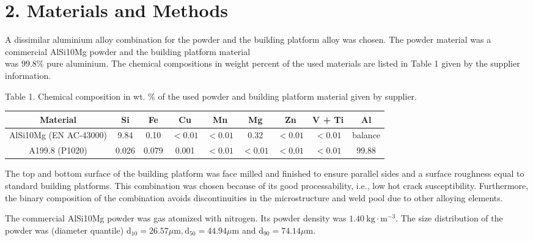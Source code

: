 \documentclass[10pt]{article}
\begin{document}
\section*{2. Materials and Methods}
A dissimilar aluminium alloy combination for the powder and the building platform alloy was chosen. The powder material was a commercial AlSi10Mg powder and the building platform material\\
was $99.8 \%$ pure aluminium. The chemical compositions in weight percent of the used materials are listed in Table 1 given by the supplier information.

Table 1. Chemical composition in wt. \% of the used powder and building platform material given by supplier.

\begin{center}
\begin{tabular}{ccccccccc}
\hline
Material & Si & Fe & Cu & Mn & Mg & Zn & V + Ti & Al \\
\hline
AlSi10Mg (EN AC-43000) & 9.84 & 0.10 & $<0.01$ & $<0.01$ & 0.32 & $<0.01$ & $<0.01$ & balance \\
A199.8 (P1020) & 0.026 & 0.079 & 0.001 & $<0.01$ & $<0.01$ & $<0.01$ & $<0.01$ & 99.88 \\
\hline
\end{tabular}
\end{center}

The top and bottom surface of the building platform was face milled and finished to ensure parallel sides and a surface roughness equal to standard building platforms. This combination was chosen because of its good processability, i.e., low hot crack susceptibility. Furthermore, the binary composition of the combination avoids discontinuities in the microstructure and weld pool due to other alloying elements.

The commercial AlSi10Mg powder was gas atomized with nitrogen. Its powder density was $1.40 \mathrm{~kg} \cdot \mathrm{m}^{-3}$. The size distribution of the powder was (diameter quantile) $\mathrm{d}_{10}=26.57 \mu \mathrm{m}, \mathrm{d}_{50}=44.94 \mu \mathrm{m}$ and $\mathrm{d}_{90}=74.14 \mu \mathrm{m}$.
\end{document}
